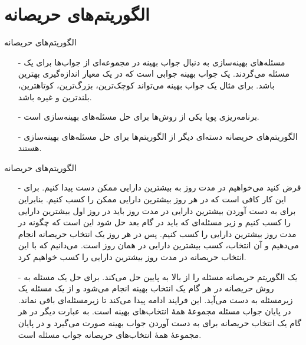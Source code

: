 \section{الگوریتم‌های حریصانه}

\begin{frame}{‌الگوریتم‌های حریصانه}
\begin{itemize}\itemr
\item[-]
مسئله‌های بهینه‌سازی به دنبال جواب بهینه در مجموعه‌ای از جواب‌ها برای یک مسئله می‌گردند. یک جواب بهینه جوابی است که در یک معیار اندازه‌گیری بهترین باشد. برای مثال یک جواب بهینه می‌تواند کوچک‌ترین، بزرگ‌ترین، کوتاهترین، بلندترین و غیره باشد.
\item[-]
برنامه‌ریزی پویا یکی از روش‌ها برای حل مسئله‌های بهینه‌سازی است.
\item[-]
الگوریتم‌های حریصانه
دسته‌ای دیگر از الگوریتم‌ها برای حل مسئله‌های بهینه‌سازی هستند.
\end{itemize}
\end{frame}


\begin{frame}{‌الگوریتم‌های حریصانه}
\begin{itemize}\itemr
\item[-]
فرض کنید می‌خواهیم در مدت
روز به بیشترین دارایی ممکن دست پیدا کنیم.
برای این کار کافی است که در هر روز بیشترین دارایی ممکن را کسب کنیم.
بنابراین برای به دست آوردن بیشترین دارایی در مدت
روز باید در روز اول بیشترین دارایی را کسب کنیم و زیر مسئله‌ای که باید در گام بعد حل شود این است که چگونه در مدت
روز بیشترین دارایی را کسب کنیم.
پس در هر روز یک انتخاب حریصانه انجام می‌دهیم و آن انتخاب، کسب بیشترین دارایی در همان روز است. می‌دانیم که با این انتخاب حریصانه در مدت
روز بیشترین دارایی را کسب خواهیم کرد.
\item[-]
یک الگوریتم حریصانه مسئله را از بالا به پایین حل می‌کند. برای حل یک مسئله به روش حریصانه در هر گام یک انتخاب بهینه انجام می‌شود و از یک مسئله یک زیرمسئله به دست می‌آید.
این فرایند ادامه پیدا می‌کند تا زیرمسئله‌ای باقی نماند. در پایان جواب مسئله مجموعهٔ همهٔ انتخاب‌های بهینه است.
به عبارت دیگر در هر گام یک انتخاب حریصانه برای به دست آوردن جواب بهینه صورت می‌گیرد و در پایان مجموعهٔ همهٔ انتخاب‌های حریصانه جواب مسئله است.
\end{itemize}
\end{frame}


